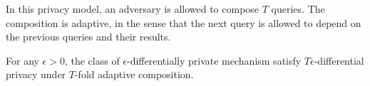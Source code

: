 \begin{frame}
{      \begin{definition}
        In this privacy model, an adversary is allowed to compose $T$ queries. The composition is \alert{adaptive}, in the sense that the next query is allowed to depend on the previous queries and their results.
      \end{definition}
      \begin{theorem}
        For any $\epsilon > 0$, the class of $\epsilon$-differentially private mechanism satisfy $T \epsilon$-differential privacy under $T$-fold adaptive composition.
      \end{theorem}
 }
\end{frame}

